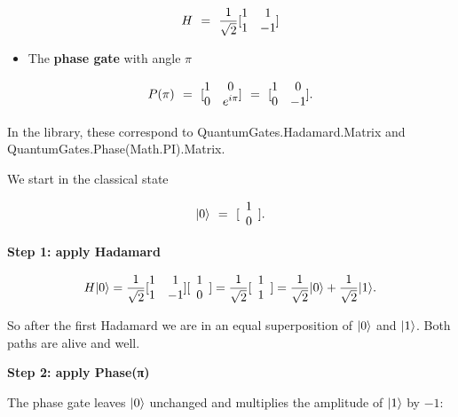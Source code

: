 \documentclass[a4paper,11pt]{article}
\begin{document}
\[H\text{\:\,} = \text{\:\,}\frac{1}{\sqrt{2}}\lbrack\begin{matrix}
1 & 1 \\
1 & - 1
\end{matrix}\rbrack
\]

\begin{itemize}
\item
  The \textbf{phase gate} with angle \(\pi\)
\end{itemize}

\[P(\pi)\text{\:\,} = \text{\:\,}\lbrack\begin{matrix}
1 & 0 \\
0 & e^{i\pi}
\end{matrix}\rbrack\text{\:\,} = \text{\:\,}\lbrack\begin{matrix}
1 & 0 \\
0 & - 1
\end{matrix}\rbrack.
\]

In the library, these correspond to QuantumGates.Hadamard.Matrix and QuantumGates.Phase(Math.PI).Matrix.

We start in the classical state

\[\lvert 0 \rangle\text{\:\,} = \text{\:\,}\lbrack\begin{array}{r}
1 \\
0
\end{array}\rbrack.
\]

\textbf{Step 1: apply Hadamard}

\[H \lvert 0 \rangle = \frac{1}{\sqrt{2}}\lbrack\begin{matrix}
1 & 1 \\
1 & - 1
\end{matrix}\rbrack\lbrack\begin{array}{r}
1 \\
0
\end{array}\rbrack = \frac{1}{\sqrt{2}}\lbrack\begin{array}{r}
1 \\
1
\end{array}\rbrack = \frac{1}{\sqrt{2}} \lvert 0 \rangle + \frac{1}{\sqrt{2}} \lvert 1 \rangle.
\]

So after the first Hadamard we are in an equal superposition of \(\lvert 0 \rangle\) and \(\lvert 1 \rangle\). Both paths are alive and well.

\textbf{Step 2: apply Phase(π)}

The phase gate leaves \(\lvert 0 \rangle\) unchanged and multiplies the amplitude of \(\lvert 1 \rangle\) by \(- 1\):
\end{document}
